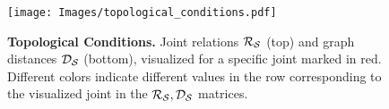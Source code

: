 \begin{figure}
    \centering
    
\texttt{[image: Images/topological\_conditions.pdf]}
    \caption{
        \textbf{Topological Conditions.}
        Joint relations $\mathcal{R}_{\mathcal{S}}$ (top) and graph distances  $\mathcal{D}_{\mathcal{S}}$ (bottom), visualized for a specific joint marked in red. Different colors indicate different values in the row corresponding to the visualized joint in the $\mathcal{R}_{\mathcal{S}}, \mathcal{D}_{\mathcal{S}}$ matrices.
       }
    \label{fig:topo_cond}
    \Description[]{}  %
\end{figure}
